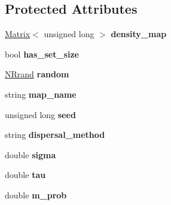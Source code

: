 \subsection*{Protected Attributes}
\begin{DoxyCompactItemize}
\item 
\hyperlink{class_matrix}{Matrix}$<$ unsigned long $>$ {\bfseries density\+\_\+map}\hypertarget{class_simulate_dispersal_adc8906f6baa62b92b037c9e275356ca7}{}\label{class_simulate_dispersal_adc8906f6baa62b92b037c9e275356ca7}

\item 
bool {\bfseries has\+\_\+set\+\_\+size}\hypertarget{class_simulate_dispersal_aff72c923e8454470b2d4c8935061fb21}{}\label{class_simulate_dispersal_aff72c923e8454470b2d4c8935061fb21}

\item 
\hyperlink{class_n_rrand}{N\+Rrand} {\bfseries random}\hypertarget{class_simulate_dispersal_a5f6389fc4116b52622a900c55532f86b}{}\label{class_simulate_dispersal_a5f6389fc4116b52622a900c55532f86b}

\item 
string {\bfseries map\+\_\+name}\hypertarget{class_simulate_dispersal_af1dc4cf60a69aafc2be4c80b0e9228c2}{}\label{class_simulate_dispersal_af1dc4cf60a69aafc2be4c80b0e9228c2}

\item 
unsigned long {\bfseries seed}\hypertarget{class_simulate_dispersal_af9ab2fa8b2c3e1bb1ba49b31679ae0d7}{}\label{class_simulate_dispersal_af9ab2fa8b2c3e1bb1ba49b31679ae0d7}

\item 
string {\bfseries dispersal\+\_\+method}\hypertarget{class_simulate_dispersal_aedabf3440f475bc15d4b95f9e8500d94}{}\label{class_simulate_dispersal_aedabf3440f475bc15d4b95f9e8500d94}

\item 
double {\bfseries sigma}\hypertarget{class_simulate_dispersal_ad6d6ae35911ed2bd045bf8e5bb30b628}{}\label{class_simulate_dispersal_ad6d6ae35911ed2bd045bf8e5bb30b628}

\item 
double {\bfseries tau}\hypertarget{class_simulate_dispersal_aa195b7e1b697c93e85a923eea5fabccc}{}\label{class_simulate_dispersal_aa195b7e1b697c93e85a923eea5fabccc}

\item 
double {\bfseries m\+\_\+prob}\hypertarget{class_simulate_dispersal_ae4b679b39467170abf45845d4591e6db}{}\label{class_simulate_dispersal_ae4b679b39467170abf45845d4591e6db}


\end{DoxyCompactItemize}
